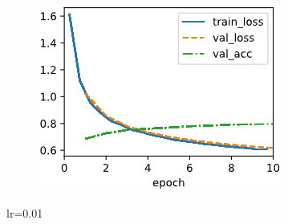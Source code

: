 \documentclass{article}
\begin{document}
\begin{figure}[ht]
\begin{center}
\begin{subfigure}[b]{0.3\columnwidth}
\includegraphics[width=\columnwidth]{img/lr0.01 cosine0.01.jpg}
\end{subfigure}
\caption{lr=0.01}
\label{lr-0.01}
\end{center}
\vskip -0.2in
\end{figure}
\end{document}
